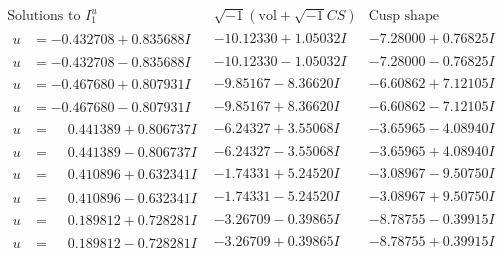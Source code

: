 \documentclass[1p]{elsarticle_modified}
\theoremstyle{definition}
\newcommand{\I}{\sqrt{-1}}
\begin{document}
$$\begin{array}{c|c|c}  
\text{Solutions to }I^u_{1}& \I (\text{vol} + \sqrt{-1}CS) & \text{Cusp shape}\\
 \hline 
\begin{aligned}
u &= -0.432708 + 0.835688 I\end{aligned}
 & -10.12330 + 1.05032 I & -7.28000 + 0.76825 I \\ \hline\begin{aligned}
u &= -0.432708 - 0.835688 I\end{aligned}
 & -10.12330 - 1.05032 I & -7.28000 - 0.76825 I \\ \hline\begin{aligned}
u &= -0.467680 + 0.807931 I\end{aligned}
 & -9.85167 - 8.36620 I & -6.60862 + 7.12105 I \\ \hline\begin{aligned}
u &= -0.467680 - 0.807931 I\end{aligned}
 & -9.85167 + 8.36620 I & -6.60862 - 7.12105 I \\ \hline\begin{aligned}
u &= \phantom{-}0.441389 + 0.806737 I\end{aligned}
 & -6.24327 + 3.55068 I & -3.65965 - 4.08940 I \\ \hline\begin{aligned}
u &= \phantom{-}0.441389 - 0.806737 I\end{aligned}
 & -6.24327 - 3.55068 I & -3.65965 + 4.08940 I \\ \hline\begin{aligned}
u &= \phantom{-}0.410896 + 0.632341 I\end{aligned}
 & -1.74331 + 5.24520 I & -3.08967 - 9.50750 I \\ \hline\begin{aligned}
u &= \phantom{-}0.410896 - 0.632341 I\end{aligned}
 & -1.74331 - 5.24520 I & -3.08967 + 9.50750 I \\ \hline\begin{aligned}
u &= \phantom{-}0.189812 + 0.728281 I\end{aligned}
 & -3.26709 - 0.39865 I & -8.78755 - 0.39915 I \\ \hline\begin{aligned}
u &= \phantom{-}0.189812 - 0.728281 I\end{aligned}
 & -3.26709 + 0.39865 I & -8.78755 + 0.39915 I \\ \hline\begin{aligned}

\end{aligned}
\end{array}$$
\end{document}
